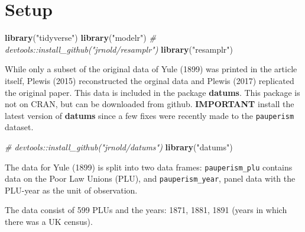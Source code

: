 \documentclass[]{article}
\newenvironment{Shaded}{\begin{snugshade}}{\end{snugshade}}
\newcommand{\KeywordTok}[1]{\textcolor[rgb]{0.13,0.29,0.53}{\textbf{#1}}}
\newcommand{\DataTypeTok}[1]{\textcolor[rgb]{0.13,0.29,0.53}{#1}}
\newcommand{\StringTok}[1]{\textcolor[rgb]{0.31,0.60,0.02}{#1}}
\newcommand{\CommentTok}[1]{\textcolor[rgb]{0.56,0.35,0.01}{\textit{#1}}}
\newcommand{\OperatorTok}[1]{\textcolor[rgb]{0.81,0.36,0.00}{\textbf{#1}}}
\newcommand{\NormalTok}[1]{#1}
\begin{document}
\section{Setup}\label{setup}

\begin{Shaded}
\begin{Highlighting}[]
\KeywordTok{library}\NormalTok{(}\StringTok{"tidyverse"}\NormalTok{)}
\KeywordTok{library}\NormalTok{(}\StringTok{"modelr"}\NormalTok{)}
\CommentTok{# devtools::install_github("jrnold/resamplr")}
\KeywordTok{library}\NormalTok{(}\StringTok{"resamplr"}\NormalTok{)}
\end{Highlighting}
\end{Shaded}

While only a subset of the original data of Yule (1899) was printed in
the article itself, Plewis (2015) reconstructed the orginal data and
Plewis (2017) replicated the original paper. This data is included in
the package \textbf{datums}. This package is not on CRAN, but can be
downloaded from github. \textbf{IMPORTANT} install the latest version of
\textbf{datums} since a few fixes were recently made to the
\texttt{pauperism} dataset.

\begin{Shaded}
\begin{Highlighting}[]
\CommentTok{# devtools::install_github("jrnold/datums")}
\KeywordTok{library}\NormalTok{(}\StringTok{"datums"}\NormalTok{)}
\end{Highlighting}
\end{Shaded}

The data for Yule (1899) is split into two data frames:
\texttt{pauperism\_plu} contains data on the Poor Law Unions (PLU), and
\texttt{pauperism\_year}, panel data with the PLU-year as the unit of
observation.

\begin{Shaded}
\end{Shaded}

The data consist of 599 PLUs and the years: 1871, 1881, 1891 (years in
which there was a UK census).
\end{document}
